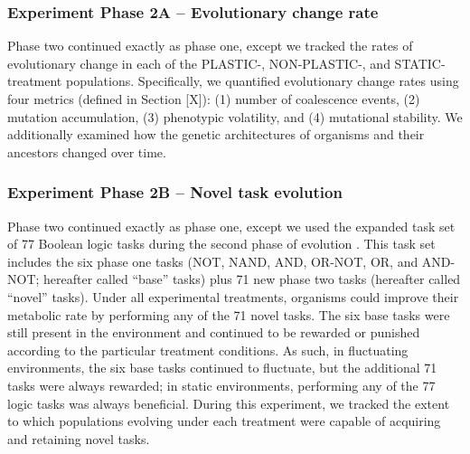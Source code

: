 

\subsubsection{Experiment Phase 2A -- Evolutionary change rate}

Phase two continued exactly as phase one, except we tracked the rates of evolutionary change in each of the PLASTIC-, NON-PLASTIC-, and STATIC-treatment populations. 
Specifically, we quantified evolutionary change rates using four metrics (defined in Section [X]):
(1) number of coalescence events,
(2) mutation accumulation, 
(3) phenotypic volatility,
and (4) mutational stability.
We additionally examined how the genetic architectures of organisms and their ancestors changed over time.  

\subsubsection{Experiment Phase 2B -- Novel task evolution}

Phase two continued exactly as phase one, except we used the expanded task set of 77 Boolean logic tasks during the second phase of evolution \citep{ofria_avida:_2009}.
This task set includes the six phase one tasks (NOT, NAND, AND, OR-NOT, OR, and AND-NOT; hereafter called ``base'' tasks) plus 71 new phase two tasks (hereafter called ``novel'' tasks).
Under all experimental treatments, organisms could improve their metabolic rate by performing any of the 71 novel tasks.
The six base tasks were still present in the environment and continued to be rewarded or punished according to the particular treatment conditions.
As such, in fluctuating environments, the six base tasks continued to fluctuate, but the additional 71 tasks were always rewarded; in static environments, performing any of the 77 logic tasks was always beneficial.
During this experiment, we tracked the extent to which populations evolving under each treatment were capable of acquiring and retaining novel tasks.  

